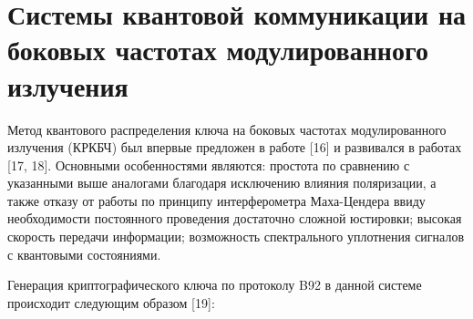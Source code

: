 
\section{Системы квантовой коммуникации на боковых частотах модулированного излучения} \label{sec:ch1/sec4}

Метод квантового распределения ключа на боковых частотах модулированного излучения (КРКБЧ) был впервые предложен в работе [16] и развивался в работах [17, 18]. Основными особенностями являются: простота по сравнению с указанными выше аналогами благодаря исключению влияния поляризации, а также отказу от работы по принципу интерферометра Маха-Цендера ввиду необходимости постоянного проведения достаточно сложной юстировки; высокая скорость передачи информации; возможность спектрального уплотнения сигналов с квантовыми состояниями.

 
Генерация криптографического ключа по протоколу B92 в данной системе происходит следующим образом [19]:


